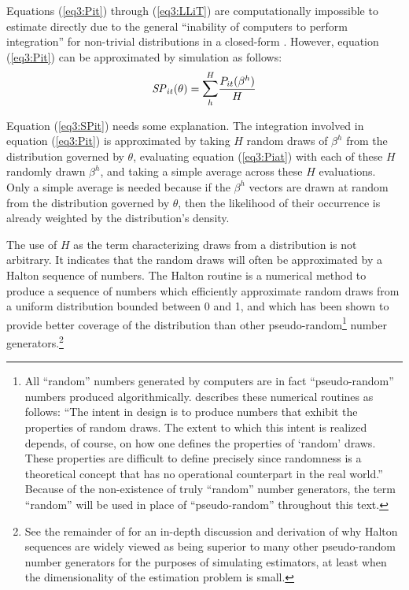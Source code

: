 \documentclass[../main.tex]{subfiles}
\begin{document}
Equations (\ref{eq3:Pit}) through (\ref{eq3:LLiT}) are computationally impossible to estimate directly due to the general \enquote{inability of computers to perform integration} for non-trivial distributions in a closed-form \parencite[2]{Train2002}.
However, equation (\ref{eq3:Pit}) can be approximated by simulation as follows:
\begin{equation}
	\label{eq3:SPit}
	\mathit{SP}_{it}(\theta) = \mathlarger{\sum}_h^H \frac{ P_{it}(\beta^h) }{H}
\end{equation}

Equation (\ref{eq3:SPit}) needs some explanation.
The integration involved in equation (\ref{eq3:Pit}) is approximated by taking $H$ random draws of $\beta^h$ from the distribution governed by $\theta$, evaluating equation (\ref{eq3:Piat}) with each of these $H$ randomly drawn $\beta^h$, and taking a simple average across these $H$ evaluations.
Only a simple average is needed because if the $\beta^h$ vectors are drawn at random from the distribution governed by $\theta$, then the likelihood of their occurrence is already weighted by the distribution's density.

The use of $H$ as the term characterizing draws from a distribution is not arbitrary.
It indicates that the random draws will often be approximated by a Halton sequence of numbers.
The Halton routine is a numerical method to produce a sequence of numbers which efficiently approximate random draws from a uniform distribution bounded between 0 and 1, and which has been shown to provide better coverage of the distribution than other pseudo-random\footnote{
	All \enquote{random} numbers generated by computers are in fact \enquote{pseudo-random} numbers produced algorithmically.
	\textcite[234]{Train2002} describes these numerical routines as follows:
	\enquote{The intent in  design  is to produce numbers that exhibit the properties of random draws.
		The extent to which this intent is realized depends, of course, on how one defines the properties of \enquote{random} draws.
		These properties are difficult to define precisely since randomness is a theoretical concept that has no operational counterpart in the real world.}
	Because of the non-existence of truly \enquote{random} number generators, the term \enquote{random} will be used in place of \enquote{pseudo-random} throughout this text.
} number generators.\footnote{
	See the remainder of \textcite[Chapter~9]{Train2002} for an in-depth discussion and derivation of why Halton sequences are widely viewed as being superior to many other pseudo-random number generators for the purposes of simulating estimators, at least when the dimensionality of the estimation problem is small.
}
\end{document}
